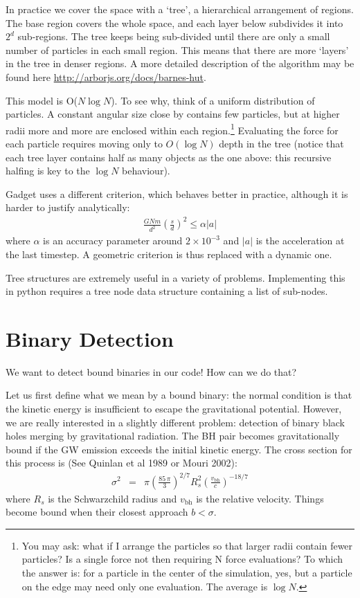 \documentclass[12pt]{article}
\begin{document}
In practice we cover the space with a `tree', a hierarchical arrangement of regions. The base region covers the whole space, and each layer below subdivides it into $2^d$ sub-regions. The tree keeps being sub-divided until there are only a small number of particles in each small region. This means that there are more `layers' in the tree in denser regions. A more detailed description of the algorithm may be found here \url{http://arborjs.org/docs/barnes-hut}.

This model is O($N \log N$). To see why, think of a uniform distribution of particles. A constant angular size close by contains few particles, but at higher radii more and more are enclosed within each region.\footnote{You may ask: what if I arrange the particles so that larger radii contain fewer particles? Is a single force not then requiring N force evaluations? To which the answer is: for a particle in the center of the simulation, yes, but a particle on the edge may need only one evaluation. The average is $\log N$.} Evaluating the force for each particle requires moving only to $O(\log N)$ depth in the tree (notice that each tree layer contains half as many objects as the one above: this recursive halfing is key to the $\log N$ behaviour).

Gadget uses a different criterion, which behaves better in practice, although it is harder to justify analytically:
\begin{align}
 \frac{G N m}{d^2} \left(\frac{s}{d}\right)^2 \leq \alpha |a|
\end{align}
where $\alpha$ is an accuracy parameter around $2 \times 10^{-3}$ and $|a|$ is the acceleration at the last timestep. A geometric criterion is thus replaced with a dynamic one.

Tree structures are extremely useful in a variety of problems. Implementing this in python requires a tree node data structure containing a list of sub-nodes.

\section{Binary Detection}

We want to detect bound binaries in our code! How can we do that?

Let us first define what we mean by a bound binary: the normal condition is that the kinetic energy is insufficient to escape the gravitational potential. However, we are really interested in a slightly different problem: detection of binary black holes merging by gravitational radiation. The BH pair becomes gravitationally bound if the GW
emission exceeds the initial kinetic energy. The cross
section for this process is (See Quinlan et al 1989 or Mouri 2002):
\begin{eqnarray}
     \sigma^2 &=& \pi \left( \frac{85\, \pi}{3}
     \right)^{2/7} R_{s}^2 \left(\frac{v_\mathrm{bh}}{c}\right)^{-18/7}
\label{eqn:crosssection}
\end{eqnarray}
where $R_s$ is the Schwarzchild radius and $v_\mathrm{bh}$ is the relative velocity. Things become bound when their closest approach $b < \sigma$.
\end{document}
